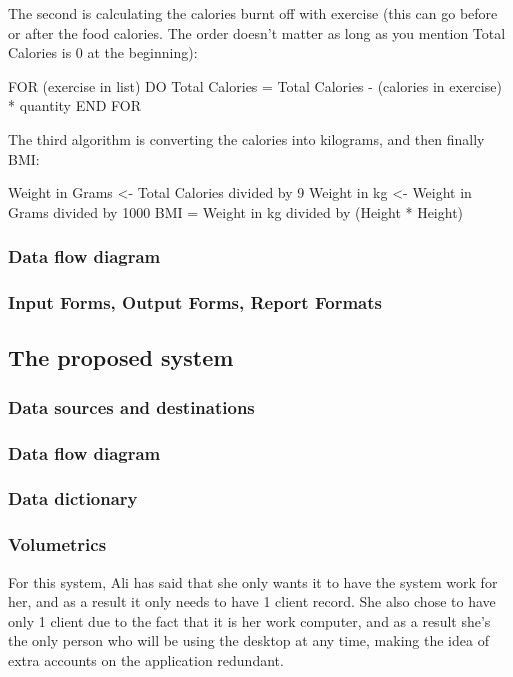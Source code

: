 The second is calculating the calories burnt off with exercise (this can go before or after the food calories. The order doesn't matter as long as you mention Total Calories is 0 at the beginning):

FOR (exercise in list) DO
	Total Calories = Total Calories - (calories in exercise) * quantity
END FOR

The third algorithm is converting the calories into kilograms, and then finally BMI:

Weight in Grams <- Total Calories divided by 9
Weight in kg <- Weight in Grams divided by 1000
BMI = Weight in kg divided by (Height * Height)

\subsubsection{Data flow diagram}

\subsubsection{Input Forms, Output Forms, Report Formats}

\subsection{The proposed system}

\subsubsection{Data sources and destinations}

\subsubsection{Data flow diagram}

\subsubsection{Data dictionary}

\subsubsection{Volumetrics}
For this system, Ali has said that she only wants it to have the system work for her, and as a result it only needs to have 1 client record. She also chose to have only 1 client due to the fact that it is her work computer, and as a result she's the only person who will be using the desktop at any time, making the idea of extra accounts on the application redundant.

